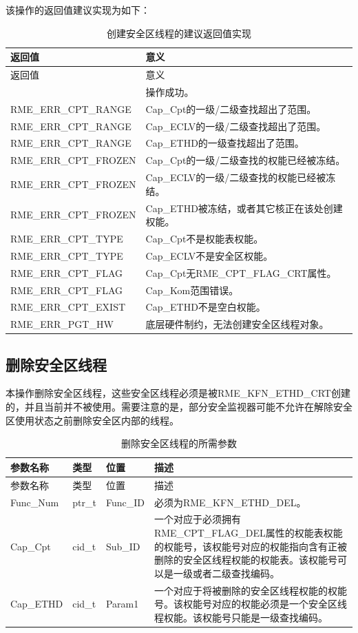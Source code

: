 该操作的返回值建议实现为如下：

\begin{xltabular}{\textwidth}{@{}>{\hsize\raggedright\arraybackslash}X>{\hsize\raggedright\arraybackslash}X@{}}
\caption{创建安全区线程的建议返回值实现}\label{tab:8-101-create-enclave-thread-suggested-return-values}\\
\toprule
返回值 & 意义\tabularnewline
\endfirsthead
\toprule
返回值 & 意义\tabularnewline
\midrule
\endhead
\bottomrule
{} & 操作成功。\tabularnewline
    RME\_ERR\_CPT\_RANGE & Cap\_Cpt的一级/二级查找超出了范围。\tabularnewline
    RME\_ERR\_CPT\_RANGE & Cap\_ECLV的一级/二级查找超出了范围。\tabularnewline
    RME\_ERR\_CPT\_RANGE & Cap\_ETHD的一级查找超出了范围。\tabularnewline
    RME\_ERR\_CPT\_FROZEN & Cap\_Cpt的一级/二级查找的权能已经被冻结。\tabularnewline
    RME\_ERR\_CPT\_FROZEN & Cap\_ECLV的一级/二级查找的权能已经被冻结。\tabularnewline
    RME\_ERR\_CPT\_FROZEN & Cap\_ETHD被冻结，或者其它核正在该处创建权能。\tabularnewline
    RME\_ERR\_CPT\_TYPE & Cap\_Cpt不是权能表权能。\tabularnewline
    RME\_ERR\_CPT\_TYPE & Cap\_ECLV不是安全区权能。\tabularnewline
    RME\_ERR\_CPT\_FLAG & Cap\_Cpt无RME\_CPT\_FLAG\_CRT属性。\tabularnewline
    RME\_ERR\_CPT\_FLAG & Cap\_Kom范围错误。\tabularnewline
    RME\_ERR\_CPT\_EXIST & Cap\_ETHD不是空白权能。\tabularnewline
    RME\_ERR\_PGT\_HW & 底层硬件制约，无法创建安全区线程对象。\tabularnewline
\end{xltabular}

\subsection{删除安全区线程}\label{subsec:8-delete-enclave-thread}

本操作删除安全区线程，这些安全区线程必须是被RME\_KFN\_ETHD\_CRT创建的，并且当前并不被使用。需要注意的是，部分安全监视器可能不允许在解除安全区使用状态之前删除安全区内部的线程。

\begin{xltabular}{\textwidth}{@{}>{\hsize\raggedright\arraybackslash}X>{\hsize\raggedright\arraybackslash}X>{\hsize\raggedright\arraybackslash}X>{\hsize\raggedright\arraybackslash}X@{}}
\caption{删除安全区线程的所需参数}\label{tab:8-102-delete-enclave-thread-parameters}\\
\toprule
参数名称 & 类型 & 位置 & 描述\tabularnewline
\endfirsthead
\toprule
参数名称 & 类型 & 位置 & 描述\tabularnewline
\midrule
\endhead
\bottomrule
\endlastfoot
Func\_Num & ptr\_t & Func\_ID &
必须为RME\_KFN\_ETHD\_DEL。\tabularnewline
Cap\_Cpt & cid\_t & Sub\_ID &
一个对应于必须拥有RME\_CPT\_FLAG\_DEL属性的权能表权能的权能号，该权能号对应的权能指向含有正被删除的安全区线程权能的权能表。该权能号可以是一级或者二级查找编码。\tabularnewline
Cap\_ETHD & cid\_t & Param1 &
一个对应于将被删除的安全区线程权能的权能号。该权能号对应的权能必须是一个安全区线程权能。该权能号只能是一级查找编码。\tabularnewline
\end{xltabular}


